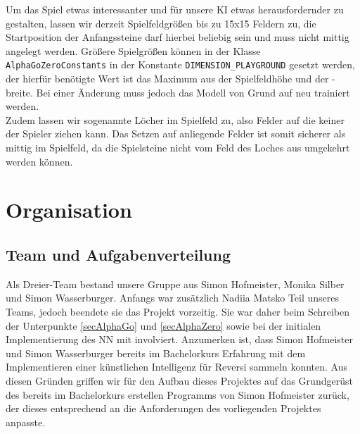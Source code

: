 \documentclass[12pt,a4paper]{article}
\begin{document}
Um das Spiel etwas interessanter und f\"{u}r unsere KI etwas herausfordernder zu gestalten, lassen wir derzeit Spielfeldgr\"{o}\ss en bis zu 15x15 Feldern zu, die Startposition der Anfangssteine darf hierbei beliebig sein und muss nicht mittig angelegt werden. Gr\"{o}\ss ere Spielgr\"{o}\ss en k\"{o}nnen in der Klasse \texttt{AlphaGoZeroConstants} in der Konstante \texttt{DIMENSION\_PLAYGROUND} gesetzt werden, der hierf\"{u}r ben\"{o}tigte Wert ist das Maximum aus der Spielfeldh\"{o}he und der -breite. Bei einer \"{A}nderung muss jedoch das Modell von Grund auf neu trainiert werden.\\
Zudem lassen wir sogenannte L\"{o}cher im Spielfeld zu, also Felder auf die keiner der Spieler ziehen kann. Das Setzen auf anliegende Felder ist somit sicherer als mittig im Spielfeld, da die Spielsteine nicht vom Feld des Loches aus umgekehrt werden k\"{o}nnen.


\newpage

\section{Organisation}

\subsection{Team und Aufgabenverteilung}
Als Dreier-Team bestand unsere Gruppe aus Simon Hofmeister, Monika Silber und Simon Wasserburger. Anfangs war zusätzlich Nadiia Matsko Teil unseres Teams, jedoch beendete sie das Projekt vorzeitig. Sie war daher beim Schreiben der Unterpunkte  \ref{secAlphaGo} und \ref{secAlphaZero} sowie bei der initialen Implementierung des NN mit involviert. Anzumerken ist, dass Simon Hofmeister und Simon Wasserburger bereits im Bachelorkurs Erfahrung mit dem Implementieren einer künstlichen Intelligenz für Reversi sammeln konnten. Aus diesen Gründen griffen wir für den Aufbau dieses Projektes auf das Grundgerüst des bereits im Bachelorkurs erstellen Programms von Simon Hofmeister zurück, der dieses entsprechend an die Anforderungen des vorliegenden Projektes anpasste.
\end{document}
